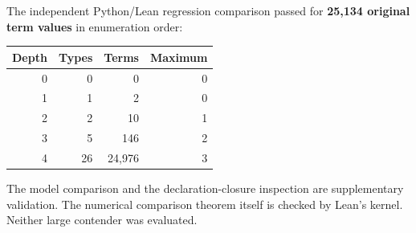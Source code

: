 The independent Python/Lean regression comparison passed for
\textbf{25,134 original term values} in enumeration order:
\begin{center}
\begin{tabular}{@{}rrrr@{}}
\toprule
Depth & Types & Terms & Maximum\\
\midrule
0 & 0 & 0 & 0\\
1 & 1 & 2 & 0\\
2 & 2 & 10 & 1\\
3 & 5 & 146 & 2\\
4 & 26 & 24,976 & 3\\
\bottomrule
\end{tabular}
\end{center}
The model comparison and the declaration-closure inspection are supplementary
validation. The numerical comparison theorem itself is checked by Lean's
kernel. Neither large contender was evaluated.
